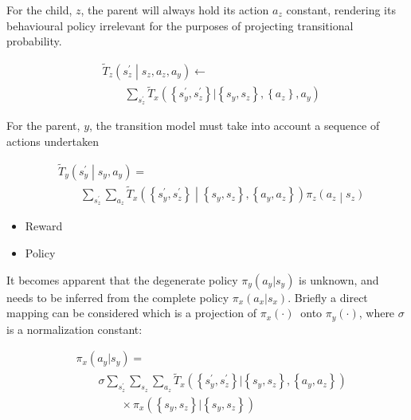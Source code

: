\documentclass[compsoc,journal,letterpaper,10pt,draftcls,twocolumn]{IEEEtran}
\begin{document}
For the child, \(z\), the parent will always hold its action \(a_{z}\)
constant, rendering its behavioural policy irrelevant for the purposes
of projecting transitional probability.

 
\begin{align}
& {\tilde{T}}_{z}\left( s_{z}^{\prime}\middle| s_{z}, a_{z}, a_{y} \right) \leftarrow \nonumber \\ 
& \qquad \sum_{s_{z}^{\prime}}{\tilde{T}}_{x}\left( \left\{ s_{y}^{\prime},s_{z}^{\prime} \right\}|\left\{ s_{y},s_{z}\right\},\left\{ a_{z} \right\},a_{y} \right)
\end{align} 

For the parent, $y$, the transition model must take into account a
sequence of actions undertaken

 
\begin{align}
& {\tilde{T}}_{y}\left( s_{y}^{\prime}\middle| s_{y}, a_{y} \right) = \nonumber \\ 
& \qquad \sum_{s_{z}^{\prime}} \sum_{a_{z}} 
{\tilde{T}}_{x}
\left( 
     \left\{ s_{y}^{\prime}, s_{z}^{\prime} \right\}
\middle|
     \left\{ s_{y}, s_{z} \right\}, \left\{ a_{y}, a_{z} \right\} 
\right) 
\pi_{z}\left( a_{z} \middle| s_{z} \right)
\end{align}
 

\begin{itemize}
\item
  Reward
\item
  Policy
\end{itemize}

It becomes apparent that the degenerate policy
\(\pi_{y}\left( a_{y}|s_{y} \right)\) is unknown, and needs to be
inferred from the complete policy \(\pi_{x}\left( a_{x}|s_{x} \right)\).
Briefly a direct mapping can be considered which is a projection of
\(\pi_{x}\left( \cdot \right)\ \) onto
\(\pi_{y}\left( \cdot \right)\), where \(\sigma\) is a normalization
constant:

\begin{align}
& \pi_{x}\left( a_{y} |s_{y} \right) = \nonumber \\ 
& \qquad \sigma\sum_{s_{z}^{\prime}}\sum_{s_{z}}\sum_{a_{z}} {\tilde{T}}_{x}\left( \left\{ s_{y}^{\prime},s_{z}^{\prime} \right\}|\left\{ s_{y}, s_{z} \right\},\left\{ a_{y},a_{z} \right\} \right) \nonumber \\ 
& \qquad \qquad \times \pi_{x}\left( \left\{ s_{y}, s_{z} \right\}|\left\{ s_{y}, s_{z} \right\} \right)
\end{align}
 
\end{document}
